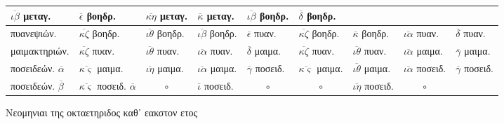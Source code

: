 \begin{tabular}{l llllllll}
$\overline{\iota\beta}$      \textgreek{μεταγ.} &
$\overline{\epsilon}$        \textgreek{βοηδρ.} &
$\overline{\kappa\eta}$      \textgreek{μεταγ.} &
$\overline{\kappa}$          \textgreek{μεταγ.} &
$\overline{\iota\beta}$      \textgreek{βοηδρ.} &
$\overline{\delta}$          \textgreek{βοηδρ.}
\\
\hline
\textgreek{πυανεψιών.} &
$\overline{\kappa\zeta}$     \textgreek{βοηδρ.} &
$\overline{\iota\theta}$     \textgreek{βοηδρ.} &
$\overline{\iota\beta}$      \textgreek{βοηδρ.} &
$\overline{\epsilon}$        \textgreek{πυαν.} &
$\overline{\kappa\zeta}$     \textgreek{βοηδρ.} &
$\overline{\kappa}$          \textgreek{βοηδρ.} &
$\overline{\iota\alpha}$     \textgreek{πυαν.} &
$\overline{\delta}$          \textgreek{πυαν.}
\\
\textgreek{μαιμακτηριών.} &
$\overline{\kappa\zeta}$     \textgreek{πυαν.} &
$\overline{\iota\theta}$     \textgreek{πυαν.} &
$\overline{\iota\alpha}$     \textgreek{πυαν.} &
$\overline{\delta}$          \textgreek{μαιμα.} &
$\overline{\kappa\zeta}$     \textgreek{πυαν.} &
$\overline{\iota\theta}$     \textgreek{πυαν.} &
$\overline{\iota\alpha}$     \textgreek{μαιμα.} &
$\overline{\gamma}$          \textgreek{μαιμα.}
\\
\textgreek{ποσειδεών.} $\overline{\alpha}$&
$\overline{\kappa\varsigma}$ \textgreek{μαιμα.} &
$\overline{\iota\eta}$       \textgreek{μαιμα.} &
$\overline{\iota\alpha}$     \textgreek{μαιμα.} &
$\overline{\gamma}$          \textgreek{ποσειδ.} &
$\overline{\kappa\varsigma}$ \textgreek{μαιμα.} &
$\overline{\iota\theta}$     \textgreek{μαιμα.} &
$\overline{\iota\alpha}$     \textgreek{ποσειδ.} &
$\overline{\gamma}$          \textgreek{ποσειδ.}
\\
\textgreek{ποσειδεών.} $\overline{\beta}$&
$\overline{\kappa\varsigma}$ \textgreek{ποσειδ.} $\overline{\alpha}$ &
    \multicolumn{1}{c}{$\circ$} &
$\overline{\iota}$           \textgreek{ποσειδ.} &
    \multicolumn{1}{c}{$\circ$} &
    \multicolumn{1}{c}{$\circ$} &
$\overline{\iota\eta}$       \textgreek{ποσειδ.} &
    \multicolumn{1}{c}{$\circ$} &
~
\\
\end{tabular}
%
\caption{\textgreek{Νεομηνιαι της οκταετηριδος καθ᾽ εακστον ετος}}
\label{tab:p067b}
%